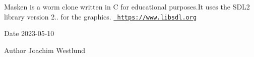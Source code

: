 Masken is a worm clone written in C for educational purposes.\+It uses the S\+D\+L2 library version 2.. for the graphics. \href{https://www.libsdl.org}{\texttt{ https\+://www.\+libsdl.\+org}}

\begin{DoxyDate}{Date}
2023-\/05-\/10 
\end{DoxyDate}
\begin{DoxyAuthor}{Author}
Joachim Westlund 
\end{DoxyAuthor}
